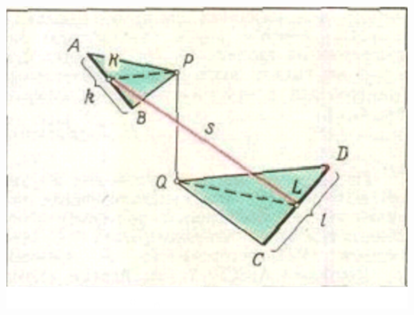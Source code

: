 \documentclass[8pt]{article}
\begin{document}
\title{}
\author{}
\date{}

\maketitle
\vspace*{-50mm}

\onehalfspacing

\begin{multicols}{2} %

 \includegraphics[scale=0.96]{рисунок6.png}


\end{multicols}
\end{document}
